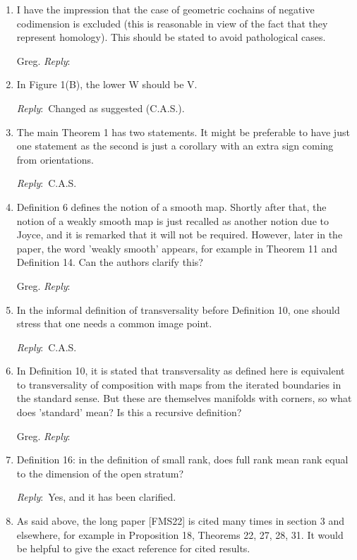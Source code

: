 \documentclass{amsart}
\newcommand{\ar}{\medskip\noindent\textit{Reply}:\ }
\newcommand{\tbw}{\ar \hrulefill}
\newcommand{\cas}{\ar C.A.S.}
\begin{document}
	\begin{enumerate}
		\item I have the impression that the case of geometric cochains of negative codimension is excluded (this is reasonable in view of the fact that they represent homology). This should be stated to avoid pathological cases.

		Greg. \tbw

		\item In Figure 1(B), the lower W should be V.

		\ar Changed as suggested (C.A.S.).

		\item The main Theorem 1 has two statements. It might be preferable to have just one statement as the second is just a corollary with an extra sign coming from orientations.

		\cas

		\item Definition 6 defines the notion of a smooth map. Shortly after that, the notion of a weakly smooth map is just recalled as another notion due to Joyce, and it is remarked that it will not be required. However, later in the paper, the word 'weakly smooth' appears, for example in Theorem 11 and Definition 14. Can the authors clarify this?

		Greg. \tbw

		\item In the informal definition of transversality before Definition 10, one should stress that one needs a common image point.

		\cas

		\item In Definition 10, it is stated that transversality as defined here is equivalent to transversality of composition with maps from the iterated boundaries in the standard sense. But these are themselves manifolds with corners, so what does 'standard' mean? Is this a recursive definition?

		Greg. \tbw

		\item Definition 16: in the definition of small rank, does full rank mean rank equal to the dimension of the open stratum?

		\ar Yes, and it has been clarified.

		\item As said above, the long paper [FMS22] is cited many times in section 3 and elsewhere, for example in Proposition 18, Theorems 22, 27, 28, 31. It would be helpful to give the exact reference for cited results.


\end{enumerate}
\end{document}
